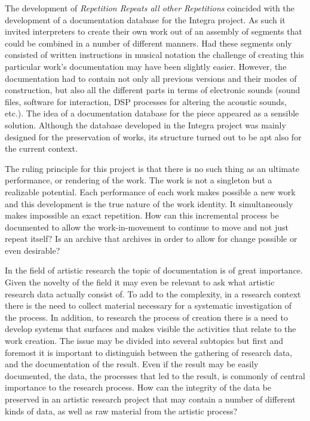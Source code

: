 \documentclass[runningheads,a4paper]{llncs}
\begin{document}
The development of \emph{Repetition Repeats all other Repetitions} coincided with the development of a documentation database for the Integra project. As such it invited interpreters to create their own work out of an assembly of segments that could be combined in a number of different manners. Had these segments only consisted of written instructions in musical notation the challenge of creating this particular work's documentation may have been slightly easier. However, the documentation had to contain not only all previous versions and their modes of construction, but also all the different parts in terms of electronic sounds (sound files, software for interaction, DSP processes for altering the acoustic sounds, etc.). The idea of a documentation database for the piece appeared as a sensible solution. Although the database developed in the Integra project was mainly designed for the preservation of works, its structure turned out to be apt also for the current context.

The ruling principle for this project is that there is no such thing as an ultimate performance, or rendering of the work. The work is not a singleton but a realizable potential. Each performance of each work makes possible a new work and this development is the true nature of the work identity. It simultaneously makes impossible an exact repetition. How can this incremental process be documented to allow the work-in-movement to continue to move and not just repeat itself? Is an archive that archives in order to allow for change possible or even desirable?

In the field of artistic research the topic of documentation is of great importance. Given the novelty of the field it may even be relevant to ask what artistic research data actually consist of. To add to the complexity, in a research context there is the need to collect material necessary for a systematic investigation of the process. In addition, to research the process of creation there is a need to develop systems that surfaces and makes visible the activities that relate to the work creation. The issue may be divided into several subtopics but first and foremost it is important to distinguish between the gathering of research data, and the documentation of the result. Even if the result may be easily documented, the data, the processes that led to the result, is commonly of central importance to the research process. How can the integrity of the data be preserved in an artistic research project that may contain a number of different kinds of data, as well as raw material from the artistic process? 
\end{document}

